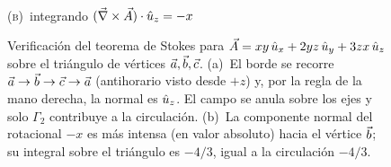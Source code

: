 \begin{figure}[ht]
\begin{minipage}[t]{0.48\textwidth}
\\[2pt]{\small\scshape (b)}\ integrando $(\vec{\nabla}\times\vec{A})\cdot\hat{u}_{z}=-x$
\end{minipage}
\caption{Verificación del teorema de Stokes para $\vec{A}=xy\,\hat{u}_{x}+2yz\,\hat{u}_{y}+3zx\,\hat{u}_{z}$ sobre el
triángulo de vértices $\vec{a},\vec{b},\vec{c}$. (a)~El borde se recorre
$\vec{a}\to\vec{b}\to\vec{c}\to\vec{a}$ (antihorario visto desde $+z$) y, por la
regla de la mano derecha, la normal es $\hat{u}_{z}$. El campo se anula sobre los ejes y
solo $\Gamma_2$ contribuye a la circulación. (b)~La componente normal del
rotacional $-x$ es más intensa (en valor absoluto) hacia el vértice $\vec{b}$; su
integral sobre el triángulo es $-4/3$, igual a la circulación $-4/3$.}
\label{fig:sem-stokes}
\end{figure}
